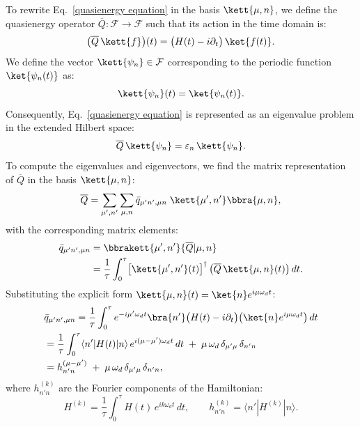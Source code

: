 To rewrite Eq.~\eqref{quasienergy equation} in the basis $\kett{\mu,n}$, we define the quasienergy operator $\overline{Q}:\mathcal{F}\to\mathcal{F}$ such that its action in the time domain is:
\begin{equation}
    \bigl(\overline{Q}\,\kett{f}\bigr)(t) = \bigl(H(t)-i\partial_{t}\bigr)\,\ket{f(t)}.
\end{equation}
We define the vector $\kett{\psi_n} \in \mathcal{F}$ corresponding to the periodic function $\ket{\psi_n(t)}$ as:
\begin{equation}
    \label{eigenvector definition}
    \kett{\psi_n}(t) = \ket{\psi_n(t)}.
\end{equation}
Consequently, Eq.~\eqref{quasienergy equation} is represented as an eigenvalue problem in the extended Hilbert space:
\begin{equation}
    \label{evals equation}
    \overline{Q}\,\kett{\psi_n} = \varepsilon_n\,\kett{\psi_n}.
\end{equation}
To compute the eigenvalues and eigenvectors, we find the matrix representation of $\overline{Q}$ in the basis $\kett{\mu,n}$:
\begin{equation}
    \overline{Q} = \sum_{\mu',n'}\sum_{\mu,n} \bar{q}_{\mu' n',\mu n}\;\kett{\mu',n'}\bbra{\mu,n},
\end{equation}
with the corresponding matrix elements:
\begin{align}
    \bar{q}_{\mu' n',\mu n}
    &= \bbrakett{\mu',n'}{\overline{Q}|\mu,n} \nonumber\\
    &= \frac{1}{\tau}\int_{0}^{\tau} \bigl[\kett{\mu',n'}(t)\bigr]^\dagger\, \bigl(\overline{Q}\,\kett{\mu,n}(t)\bigr)\,dt.
\end{align}
Substituting the explicit form $\kett{\mu,n}(t)=\ket{n}e^{i\mu\omega_d t}$:
\begin{align}
    &\bar{q}_{\mu' n',\mu n}
    = \frac{1}{\tau}\int_{0}^{\tau} e^{-i\mu'\omega_d t} \bra{n'} \bigl(H(t)-i\partial_t\bigr) \bigl(\ket{n}e^{i\mu\omega_d t}\bigr) \,dt \nonumber \\
    &= \frac{1}{\tau}\int_{0}^{\tau} \langle n'|H(t)|n\rangle\,e^{i(\mu-\mu')\omega_d t}\,dt \;+\; \mu\,\omega_d\,\delta_{\mu'\mu}\,\delta_{n'n} \nonumber \\
    &= h_{n' n}^{(\mu-\mu')} \;+\; \mu\,\omega_d\,\delta_{\mu'\mu}\,\delta_{n'n},
\end{align}
where $h_{n'n}^{(k)}$ are the Fourier components of the Hamiltonian:
\begin{equation}
    H^{(k)} = \frac{1}{\tau}\int_{0}^{\tau} H(t)\,e^{ik\omega_d t}\,dt, \qquad h^{(k)}_{n' n}=\langle n'|H^{(k)}|n\rangle.
\end{equation}
